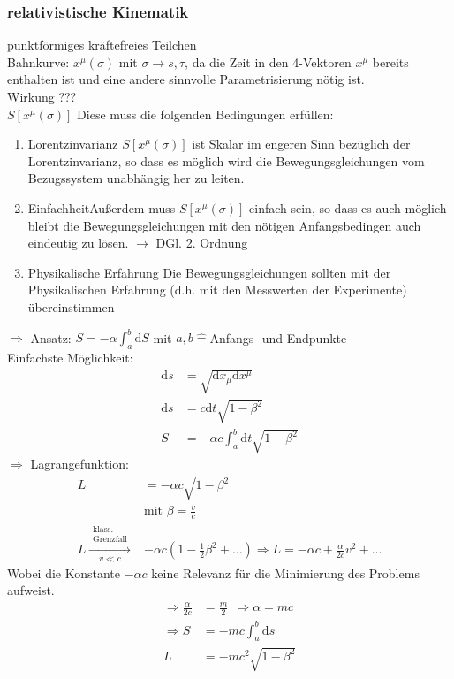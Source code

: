 \documentclass[a4paper]{article}
\begin{document}
\subsubsection{relativistische Kinematik}
punktförmiges kräftefreies Teilchen\\
Bahnkurve: $x^\mu(\sigma)$ mit $\sigma \rightarrow s,\tau$, da die Zeit in den
4-Vektoren $x^\mu$ bereits enthalten ist und eine andere sinnvolle
Parametrisierung nötig ist.\\
Wirkung ???\\
$S[x^\mu(\sigma)]$ 
Diese muss die folgenden Bedingungen erfüllen:
\begin{enumerate}
  \item{Lorentzinvarianz} $S[x^\mu(\sigma)]$ ist Skalar im engeren Sinn
   bezüglich der Lorentzinvarianz, so dass es möglich wird die
   Bewegungsgleichungen vom Bezugssystem unabhängig her zu leiten.
  \item{Einfachheit}Außerdem muss $S[x^\mu(\sigma)]$ einfach
   sein, so dass es auch möglich bleibt die Bewegungsgleichungen mit den nötigen
   Anfangsbedingen auch eindeutig zu lösen. $\rightarrow$ DGl. 2. Ordnung
  \item{Physikalische Erfahrung} Die Bewegungsgleichungen sollten mit der
  Physikalischen Erfahrung (d.h. mit den Messwerten der Experimente)
  übereinstimmen
\end{enumerate}
$\Rightarrow$ Ansatz: $S=-\alpha\int_a^b \mathrm{d}S$ mit $a,b\hat{=}$Anfangs- und
Endpunkte\\
Einfachste Möglichkeit: 
\begin{align}
\mathrm{d}s&=\sqrt{\mathrm{d}x_\mu \mathrm{d}x^\mu}\\
\mathrm{d}s&=c\mathrm{d}t\sqrt{1-\beta^2}\\
S&=-\alpha c \int_a^b \mathrm{d}t \sqrt{1-\beta^2}
\end{align}
$\Rightarrow$ Lagrangefunktion: 
\begin{align} 
L&=-\alpha c \sqrt{1-\beta^2} \\
&\text{mit }\beta=\frac{v}{c}\\
L \overset{\substack{\text{klass.}\\
\text{Grenzfall}}}{\underset{{v \ll c}}{\longrightarrow}}& 
-\alpha c \left(1-\frac{1}{2}\beta^2+\ldots\right) \Rightarrow L=-\alpha c +
\frac{\alpha}{2 c} v^2 + \ldots
\end{align}
Wobei die Konstante $-\alpha c$ keine Relevanz für die Minimierung des Problems
aufweist.
\begin{align}
\Rightarrow \frac{\alpha}{2 c}&=\frac{m}{2} \ \ \Rightarrow \alpha=m c \\
\Rightarrow S&=-mc\int^b_a \mathrm{d}s \\
L&=-mc^2\sqrt{1-\beta^2}
\end{align}
\end{document}
